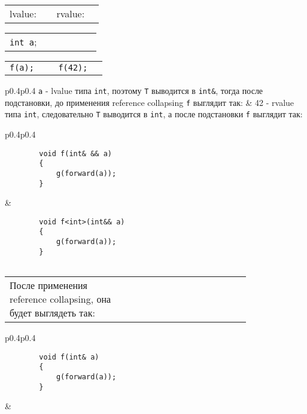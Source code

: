 \begin{center}
	\begin{tabular}{p{0.4\linewidth}p{0.4\linewidth}}
		lvalue: & rvalue:\\
	\end{tabular}
	
	\begin{tabular}{p{0.4\linewidth}p{0.4\linewidth}}
		\texttt{int a}; & \vspace{\baselineskip}\\
	\end{tabular}
	
	\begin{tabular}{p{0.4\linewidth}p{0.4\linewidth}}
		\texttt{f(a);} & \texttt{f(42);}\\
	\end{tabular}
	
	\begin{tabular}{p{0.4\linewidth}p{0.4\linewidth}}
		\texttt{a} - lvalue типа \texttt{int}, поэтому \texttt{T} выводится в \texttt{int&}, тогда после подстановки, до применения reference collapsing \texttt{f} выглядит так: & 42 - rvalue типа \texttt{int}, следовательно \texttt{Т} выводится в \texttt{int}, а после подстановки \texttt{f} выглядит так:\\
	\end{tabular}
	
	\begin{tabular}{p{0.4\linewidth}p{0.4\linewidth}}
		\begin{verbatim}
		void f(int& && a)
		{
		    g(forward(a));
		}
		\end{verbatim}
		&
		\begin{verbatim}
		void f<int>(int&& a)
		{
		    g(forward(a));
		}
		
		\end{verbatim}
	\end{tabular}
	
	\begin{tabular}{p{0.4\linewidth}p{0.4\linewidth}}
		После применения reference collapsing, она будет выглядеть так:
		& \vspace{\baselineskip}\\
	\end{tabular}
	
	\begin{tabular}{p{0.4\linewidth}p{0.4\linewidth}}
		\begin{verbatim}
		void f(int& a)
		{
		    g(forward(a));
		}
		\end{verbatim}
		& \vspace{\baselineskip}\\
	\end{tabular}
	

\end{center}
